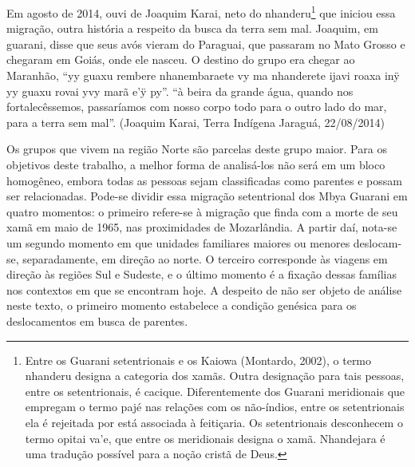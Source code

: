 \documentclass{article}
\begin{document}
Em agosto de 2014, ouvi de Joaquim Karai, neto do nhanderu\footnote{
Entre os Guarani setentrionais e os Kaiowa (Montardo, 2002), o termo
nhanderu designa a categoria dos xam\~as. Outra designa\c{c}\~ao para
tais pessoas, entre os setentrionais, \'e cacique. Diferentemente dos
Guarani meridionais que empregam o termo paj\'e nas rela\c{c}\~oes com
os n\~ao-\'indios, entre os setentrionais ela \'e rejeitada por est\'a
associada \`a feiti\c{c}aria. Os setentrionais desconhecem o termo
opitai va{\textquoteright}e, que entre os meridionais designa o xam\~a.
Nhandejara \'e uma tradu\c{c}\~ao poss\'ivel para a no\c{c}\~ao
crist\~a de Deus. } que iniciou essa migra\c{c}\~ao, outra hist\'oria a
respeito da busca da terra sem mal. Joaquim, em guarani, disse que seus
av\'os vieram do Paraguai, que passaram no Mato Grosso e chegaram em
Goi\'as, onde ele nasceu. O destino do grupo era chegar ao Maranh\~ao,
{\textquotedblleft}yy guaxu rembere nhanembaraete vy ma nhanderete
ijavi roaxa in\"y yy guaxu rovai yvy mar\~a e{\textquoteright}\"y
py{\textquotedblright}. {\textquotedblleft}\`a beira da grande \'agua,
quando nos fortalec\^essemos, passar\'iamos com nosso corpo todo para o
outro lado do mar, para a terra sem mal{\textquotedblright}. (Joaquim
Karai, Terra Ind\'igena Jaragu\'a, 22/08/2014)

Os grupos que vivem na regi\~ao Norte s\~ao parcelas deste grupo maior.
Para os objetivos deste trabalho, a melhor forma de analis\'a-los n\~ao
ser\'a em um bloco homog\^eneo, embora todas as pessoas sejam
classificadas como parentes e possam ser relacionadas. Pode-se dividir
essa migra\c{c}\~ao setentrional dos Mbya Guarani em quatro momentos: o
primeiro refere-se \`a migra\c{c}\~ao que finda com a morte de seu
xam\~a em maio de 1965, nas proximidades de Mozarl\^andia. A partir
da\'i, nota-se um segundo momento em que unidades familiares maiores ou
menores deslocam-se, separadamente, em dire\c{c}\~ao ao norte. O
terceiro corresponde \`as viagens em dire\c{c}\~ao \`as regi\~oes Sul e
Sudeste, e o \'ultimo momento \'e a fixa\c{c}\~ao dessas fam\'ilias nos
contextos em que se encontram hoje. A despeito de n\~ao ser objeto de
an\'alise neste texto, o primeiro momento estabelece a condi\c{c}\~ao
gen\'esica para os deslocamentos em busca de parentes.
\end{document}
